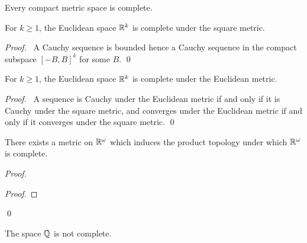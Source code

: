 \begin{corollary}
    Every compact metric space is complete.
\end{corollary}

\begin{proposition}
    For $k \geq 1$, the Euclidean space $\mathbb{R}^k$ is complete under the square metric.
\end{proposition}

\begin{proof}
    \pf\ A Cauchy sequence is bounded hence a Cauchy sequence in the compact subspace $[-B,B]^k$
    for some $B$. \qed
\end{proof}

\begin{proposition}
    For $k \geq 1$, the Euclidean space $\mathbb{R}^k$ is complete under the Euclidean metric.
\end{proposition}

\begin{proof}
    \pf\ A sequence is Cauchy under the Euclidean metric if and only if it is Cauchy under the
    square metric, and converges under the Euclidean metric if and only if it converges under
    the square metric. \qed
\end{proof}

\begin{proposition}
    There exists a metric on $\mathbb{R}^\omega$ which induces the product topology under which $\mathbb{R}^\omega$
    is complete.
\end{proposition}

\begin{proof}
    \pf
    \begin{proof}
    \end{proof}
    \qed
\end{proof}

\begin{proposition}
    The space $\mathbb{Q}$ is not complete.
\end{proposition}

